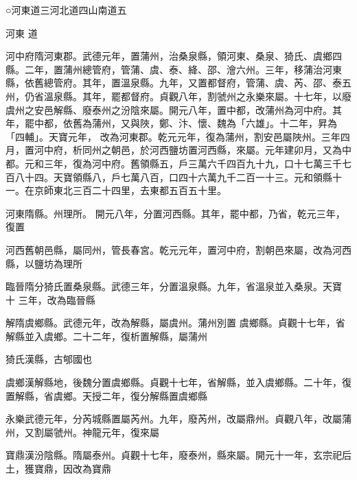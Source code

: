 
\begin{pinyinscope}

 ○河東道三河北道四山南道五



 河東
 道



 河中府隋河東郡。武德元年，置蒲州，治桑泉縣，領河東、桑泉、猗氏、虞鄉四縣。二年，置蒲州總管府，管蒲、虞、泰、絳、邵、澮六州。三年，移蒲治河東縣，依舊總管府。其年，置溫泉縣。九年，又置都督府，管蒲、虞、芮、邵、泰五州，仍省溫泉縣。其年，罷都督府。貞觀八年，割虢州之永樂來屬。十七年，以廢虞州之安邑解縣、廢泰州之汾陰來屬。開元八年，置中都，改蒲州為河中府。其年，罷中都，依舊為蒲州，又與陜，鄭、汴、懷、魏為「六雄」。十二年，昇為「四輔」。天寶元年，
 改為河東郡。乾元元年，復為蒲州，割安邑屬陜州。三年四月，置河中府，析同州之朝邑，於河西鹽坊置河西縣，來屬。元年建卯月，又為中都。元和三年，復為河中府。舊領縣五，戶三萬六千四百九十九，口十七萬三千七百八十四。天寶領縣八，戶七萬八百，口四十六萬九千二百一十三。元和領縣十一。在京師東北三百二十四里，去東都五百五十里。



 河東隋縣。州理所。
 開元八年，分置河西縣。其年，罷中都，乃省，乾元三年，復置



 河西舊朝邑縣，屬同州，管長春宮。乾元元年，置河中府，割朝邑來屬，改為河西縣，以鹽坊為理所



 臨晉隋分猗氏置桑泉縣。武德三年，分置溫泉縣。九年，省溫泉並入桑泉。天寶
 十
 三年，改為臨晉縣



 解隋虞鄉縣。武德元年，改為解縣，屬虞州。蒲州別置
 虞鄉縣。貞觀十七年，省解縣並入虞鄉。二十二年，復析置解縣，屬蒲州



 猗氏漢縣，古郇國也



 虞鄉漢解縣地，後魏分置虞鄉縣。貞觀十七年，省解縣，並入虞鄉縣。二十年，復置解縣，省虞鄉。天授二年，復分解縣置虞鄉縣



 永樂武德元年，分芮城縣置屬芮州。九年，廢芮州，改屬鼎州。貞觀八年，改屬蒲州，又割屬虢州。神龍元年，復來屬



 寶鼎漢汾陰縣。隋屬泰州。貞觀十七年，廢泰州，縣來屬。開元十一年，玄宗祀后土，獲寶鼎，因改為寶鼎




\end{pinyinscope}
